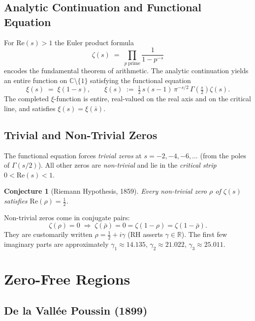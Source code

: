 \documentclass[12pt,a4paper]{article}
\newtheorem{conjecture}[theorem]{Conjecture}
\theoremstyle{remark}
\begin{document}
\subsection{Analytic Continuation and Functional Equation}

For $\mathrm{Re}(s) > 1$ the Euler product formula
\[
  \zeta(s) \;=\; \prod_{p\;\text{prime}} \frac{1}{1 - p^{-s}}
\]
encodes the fundamental theorem of arithmetic.  The analytic continuation yields an
entire function on $\mathbb{C}\setminus\{1\}$ satisfying the functional equation
\begin{equation}\label{eq:func}
  \xi(s) \;=\; \xi(1-s),
  \qquad
  \xi(s) \;:=\; \tfrac{1}{2}\,s(s-1)\,\pi^{-s/2}\,\Gamma\!\left(\tfrac{s}{2}\right)\zeta(s).
\end{equation}
The completed $\xi$-function is entire, real-valued on the real axis and on the
critical line, and satisfies $\xi(s)=\xi(\bar s)$.

\subsection{Trivial and Non-Trivial Zeros}

The functional equation forces \emph{trivial zeros} at $s = -2,-4,-6,\ldots$
(from the poles of $\Gamma(s/2)$).  All other zeros are \emph{non-trivial} and lie in
the \emph{critical strip} $0 < \mathrm{Re}(s) < 1$.

\begin{conjecture}[Riemann Hypothesis, 1859]
  Every non-trivial zero $\rho$ of $\zeta(s)$ satisfies $\mathrm{Re}(\rho) = \tfrac{1}{2}$.
\end{conjecture}

Non-trivial zeros come in conjugate pairs:
\[
  \zeta(\rho) = 0 \;\Longrightarrow\; \zeta(\bar\rho) = 0 = \zeta(1-\rho) = \zeta(1-\bar\rho).
\]
They are customarily written $\rho = \tfrac{1}{2} + i\gamma$ (RH asserts $\gamma\in\mathbb{R}$).
The first few imaginary parts are approximately
$\gamma_1 \approx 14.135$, $\gamma_2 \approx 21.022$, $\gamma_3 \approx 25.011$.

\section{Zero-Free Regions}

\subsection{De la Vallée Poussin (1899)}
\end{document}
